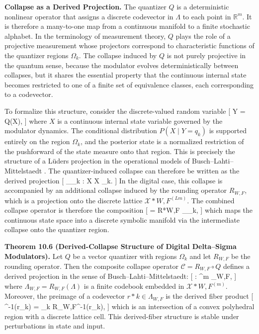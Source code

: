 \medskip

\textbf{Collapse as a Derived Projection.}
The quantizer $Q$ is a deterministic nonlinear operator that assigns a discrete codevector in $\Lambda$ to each point in $\mathbb{R}^{m}$. It is therefore a many-to-one map from a continuous manifold to a finite stochastic alphabet. In the terminology of measurement theory, $Q$ plays the role of a projective measurement whose projectors correspond to characteristic functions of the quantizer regions $\Omega_{k}$. The collapse induced by $Q$ is not purely projective in the quantum sense, because the modulator evolves deterministically between collapses, but it shares the essential property that the continuous internal state becomes restricted to one of a finite set of equivalence classes, each corresponding to a codevector.

To formalize this structure, consider the discrete-valued random variable
[
Y = Q(X),
]
where $X$ is a continuous internal state variable governed by the modulator dynamics. The conditional distribution $P(X \mid Y = q_{k})$ is supported entirely on the region $\Omega_{k}$, and the posterior state is a normalized restriction of the pushforward of the state measure onto that region. This is precisely the structure of a Lüders projection in the operational models of Busch–Lahti–Mittelstaedt \cite{busch1996quantummeasurement}. The quantizer-induced collapse can therefore be written as the derived projection
[
\Pi_{\Omega_{k}} : X \mapsto X \cap \Omega_{k}.
]
In the digital case, this collapse is accompanied by an additional collapse induced by the rounding operator $R_{W,F}$, which is a projection onto the discrete lattice $\mathcal{X}*{W,F}^{(Lm)}$. The combined collapse operator is therefore the composition
[
 = R*{W,F} \circ \Pi_{\Omega_{k}},
]
which maps the continuous state space into a discrete symbolic manifold via the intermediate collapse onto the quantizer region.

\medskip

\textbf{Theorem 10.6 (Derived-Collapse Structure of Digital Delta–Sigma Modulators).}
Let $Q$ be a vector quantizer with regions ${\Omega_{k}}$ and let $R_{W,F}$ be the rounding operator. Then the composite collapse operator $\mathcal{C} = R_{W,F} \circ Q$ defines a derived projection in the sense of Busch–Lahti–Mittelstaedt:
[
 : ^{m} \to \Lambda_{W,F},
]
where $\Lambda_{W,F} = R_{W,F}(\Lambda)$ is a finite codebook embedded in $\mathcal{X}*{W,F}^{(m)}$. Moreover, the preimage of a codevector $r*{k} \in \Lambda_{W,F}$ is the derived fiber product
[
^{-1}(r_{k}) = \Omega_{k} \cap R_{W,F}^{-1}(r_{k}),
]
which is an intersection of a convex polyhedral region with a discrete lattice cell. This derived-fiber structure is stable under perturbations in state and input.

